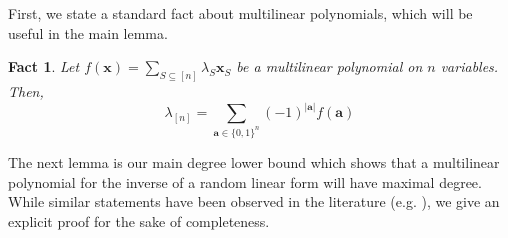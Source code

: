 \documentclass[11pt]{article}
\newtheorem{fact}[theorem]{Fact}
\newcommand{\Boo}{\{0,1 \}}
\begin{document}
First, we state a standard fact about multilinear polynomials, which will be useful in the main lemma.
\begin{fact}\label{lem:top coeff of multilinear poly}
    Let $f(\mathbf{x}) = \sum_{S\subseteq [n]} \lambda_S \mathbf{x}_S$ be a multilinear polynomial on $n$ variables. Then, $$\lambda_{[n]} = \sum_{\mathbf{a}\in\Boo^n} (-1)^{|\mathbf{a}|}f(\mathbf{a})$$
\end{fact}

The next lemma is our main degree lower bound which shows that a multilinear polynomial for the inverse of a random linear form will have maximal degree. While similar statements have been observed in the literature (e.g. \cite[Proposition 2]{Grigoriev98}), we give an explicit proof for the sake of completeness.
\end{document}
